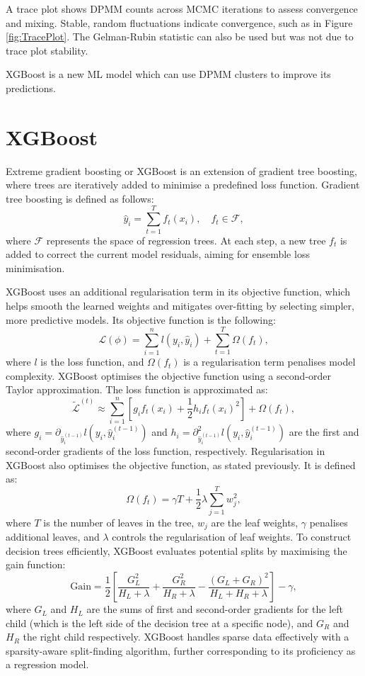 \documentclass[12pt]{report} %
\begin{document}
A trace plot shows DPMM counts across MCMC iterations to assess convergence and mixing. Stable, random fluctuations indicate convergence, such as in Figure \ref{fig:TracePlot}. The Gelman-Rubin statistic can also be used but was not due to trace plot stability.

\noindent XGBoost is a new ML model which can use DPMM clusters to improve its predictions.

\section{XGBoost}
Extreme gradient boosting or XGBoost is an extension of gradient tree boosting, where trees are iteratively added to minimise a predefined loss function.\cite{chen2016xgboost} Gradient tree boosting is defined as follows:
\[
\hat{y}_i = \sum_{t=1}^T f_t(x_i), \quad f_t \in \mathcal{F},
\]
where \( \mathcal{F} \) represents the space of regression trees.\cite{chen2016xgboost}  At each step, a new tree $f_t$
is added to correct the current model residuals, aiming for ensemble loss minimisation.

XGBoost uses an additional regularisation term in its objective function, which helps smooth the learned weights and mitigates over-fitting by selecting simpler, more predictive models.\cite{chen2016xgboost} Its objective function is the following:
\[
\mathcal{L}(\phi) = \sum_{i=1}^n l(y_i, \hat{y}_i) + \sum_{t=1}^T \Omega(f_t),
\]
where \( l \) is the loss function, and \( \Omega(f_t) \) is a regularisation term penalises model complexity.\cite{chen2016xgboost} XGBoost optimises the objective function using a second-order Taylor approximation. The loss function is approximated as:
\[
\mathcal{\tilde{L}}^{(t)} \approx \sum_{i=1}^n \left[ g_i f_t(x_i) + \frac{1}{2} h_i f_t(x_i)^2 \right] + \Omega(f_t),
\]
where \( g_i = \partial_{\hat{y}_{i}^{(t-1)}} l(y_i, \hat{y}_{i}^{(t-1)}) \) and \( h_i = \partial_{\hat{y}_{i}^{(t-1)}}^2 l(y_i, \hat{y}_{i}^{(t-1)}) \) are the first and second-order gradients of the loss function, respectively.\cite{chen2016xgboost} Regularisation in XGBoost also optimises the objective function, as stated previously. It is defined as:
\[
\Omega(f_t) = \gamma T + \frac{1}{2} \lambda \sum_{j=1}^T w_j^2,
\]
where \( T \) is the number of leaves in the tree, \( w_j \) are the leaf weights, \( \gamma \) penalises additional leaves, and \( \lambda \) controls the regularisation of leaf weights.\cite{chen2016xgboost} To construct decision trees efficiently, XGBoost evaluates potential splits by maximising the gain function:
\[
\text{Gain} = \frac{1}{2} \left[ \frac{G_L^2}{H_L + \lambda} + \frac{G_R^2}{H_R + \lambda} - \frac{(G_L + G_R)^2}{H_L + H_R + \lambda} \right] - \gamma,
\]
where \( G_L \) and \( H_L \) are the sums of first and second-order gradients for the left child (which is the left side of the decision tree at a specific node), and \( G_R \) and \( H_R \) the right child respectively. XGBoost handles sparse data effectively with a sparsity-aware split-finding algorithm, further corresponding to its proficiency as a regression model.\cite{chen2016xgboost}
\end{document}
